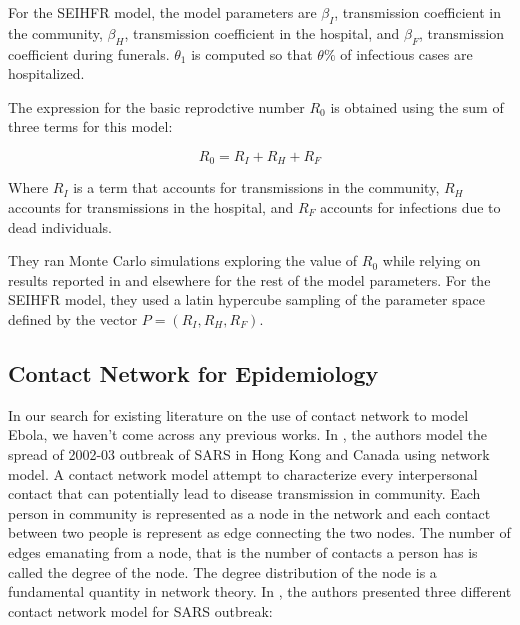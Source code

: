 \documentclass[12pt, journal,onecolumn]{IEEEtran}
\begin{document}
For the SEIHFR model, the model parameters are $\beta_I$, transmission coefficient in the
community, $\beta_H$, transmission coefficient in the hospital, and $\beta_F$, transmission
coefficient during funerals. $\theta_1$ is computed so that $\theta\%$ of infectious cases
are hospitalized.

The expression for the basic reprodctive number $R_0$ is obtained using the sum of three terms
for this model:

$$
R_0 = R_I + R_H + R_F
$$

Where $R_I$ is a term that accounts for transmissions in the community, $R_H$ accounts for
transmissions in the hospital, and $R_F$ accounts for infections due to dead individuals.

They ran Monte Carlo simulations exploring the value of $R_0$ while relying on results reported
in \citep{legrand2007understanding} and elsewhere for the rest of the model parameters.
For the SEIHFR model, they used a latin hypercube sampling of the parameter space defined by the
vector $P = (R_I, R_H, R_F)$.



\subsection{\textbf{Contact Network for Epidemiology \citep{meyers2005network}}}
In our search for existing literature on the use of contact network to model Ebola, we haven't come across any previous works. In \citep{meyers2005network}, the authors model the spread of 2002-03 outbreak of SARS in Hong Kong and Canada using network model. A contact network model attempt to characterize every interpersonal contact that can potentially lead to disease transmission in community. Each person in community is represented as a node in the network and each contact between two people is represent as edge connecting the two nodes. The number of edges emanating from a node, that is the number of contacts a person has is called the degree of the node. The degree distribution of the node is a fundamental quantity in network theory.   In \citep{meyers2005network}, the authors presented three different contact network model for SARS outbreak:
\end{document}
